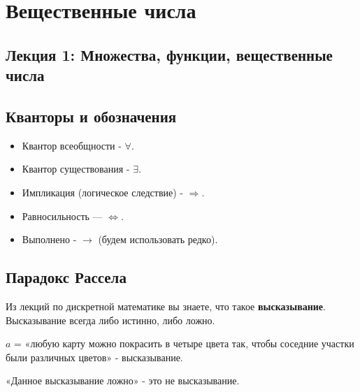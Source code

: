 



	
	\maketitle{}
	
	\tableofcontents{}

	\large
	
	\chapter{Вещественные числа}
	
	\section*{Лекция 1: Множества, функции, вещественные числа}
	
	\section{Кванторы и обозначения}
	
	\begin{itemize}
		\item Квантор всеобщности - $\forall$.
		\item Квантор существования - $\exists$.
		\item Импликация (логическое следствие) - $\Rightarrow$.
		\item Равносильность — $\Leftrightarrow$.
		\item Выполнено - $\rightarrow$ (будем использовать редко).
	\end{itemize}
	
	\section{Парадокс Рассела}
	
	Из лекций по дискретной математике вы знаете, что такое \textbf{высказывание}. Высказывание всегда либо истинно, либо ложно.
	
	\begin{example}
		$a$ = «любую карту можно покрасить в четыре цвета так, чтобы соседние участки были различных цветов» - высказывание.
	\end{example}
	
	\begin{example}
		«Данное высказывание ложно» - это не высказывание.
	\end{example}
	

